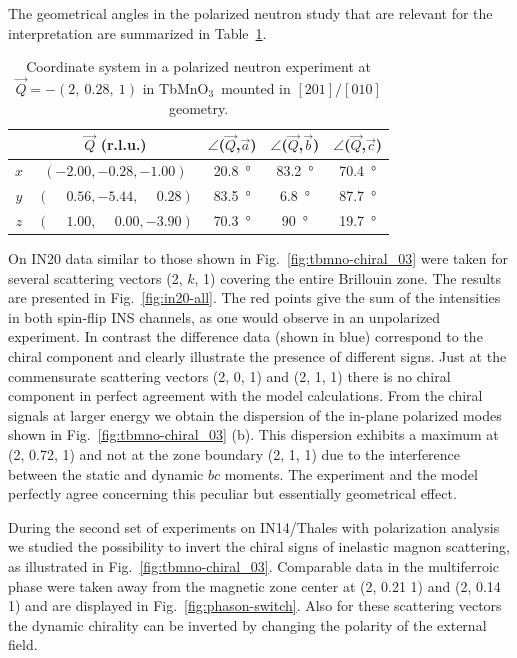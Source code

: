 \documentclass[aps,prb,twocolumn,superscriptaddress,showpacs,floatfix]{revtex4-2}
\newcommand{\tbmno}{TbMnO$_3$}
\newcommand{\aaxis}{$\vec{a}$}
\newcommand{\baxis}{$\vec{b}$}
\newcommand{\caxis}{$\vec{c}$}
\newcommand{\qvec}{$\vec{Q}$}
\begin{document}
The geometrical angles in the polarized neutron study that are relevant for the interpretation are summarized in Table~\ref{tab:tbmno-chiral}.

\begin{table}[!b]
	\begin{ruledtabular}
	\begin{tabular}{c c c c c }
\toprule %
   & $\vec{Q}$ (r.l.u.) & $\angle$(\qvec,\aaxis) & $\angle$(\qvec,\baxis) & $\angle$(\qvec,\caxis)  \\
\hline
$x$ & $(-2.00,-0.28,-1.00)$ & \SI{20.8}{\degree} & \SI{83.2}{\degree} & \SI{70.4}{\degree} \\
$y$ & $(\phantom{-}0.56,-5.44,\phantom{-}0.28)$ & \SI{83.5}{\degree} & \SI{6.8}{\degree} & \SI{87.7}{\degree} \\
$z$ & $(\phantom{-}1.00,\phantom{-}0.00,-3.90)$ & \SI{70.3}{\degree} & \SI{90}{\degree} & \SI{19.7}{\degree} \\
    \end{tabular}
	\end{ruledtabular}
    \caption{Coordinate system in a polarized neutron experiment at $\vec{Q}=-(2,~0.28,~1)$ in \tbmno\ mounted in $[201]/[010]$ geometry.}
    \label{tab:tbmno-chiral}
\end{table}

On IN20 data similar to those shown in Fig.~\ref{fig:tbmno-chiral_03} were taken for several scattering vectors (2, $k$, 1) covering the entire Brillouin
zone. The results are presented in Fig.~\ref{fig:in20-all}. The red points give the sum of the intensities in both spin-flip INS channels, as one would
observe in an unpolarized experiment. In contrast the difference data (shown in blue) correspond to the chiral component and clearly
illustrate the presence of different signs. Just at the commensurate scattering vectors (2, 0, 1) and (2, 1, 1) there is no chiral component in perfect agreement
with the model calculations. From the chiral signals at larger energy we obtain the dispersion of 
the in-plane polarized modes shown in
Fig.~\ref{fig:tbmno-chiral_03} (b). This dispersion exhibits a maximum at (2, 0.72, 1) and not at the zone boundary (2, 1, 1) due to the interference between the static
and dynamic $bc$ moments. The experiment and the model perfectly agree concerning this peculiar but essentially geometrical effect.



During the second set of experiments on  IN14/Thales  with polarization analysis we studied the 
possibility to invert the
chiral signs of inelastic magnon scattering, as  illustrated in Fig.~\ref{fig:tbmno-chiral_03}. Comparable data in the multiferroic phase were taken away from
the magnetic zone center at (2, 0.21 1) and (2, 0.14 1) and are displayed in Fig.~\ref{fig:phason-switch}.
Also for these scattering vectors the dynamic chirality can be inverted by changing the polarity of the external field.
\end{document}
